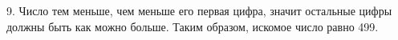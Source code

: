 9. Число тем меньше, чем меньше его первая цифра, значит остальные цифры должны быть как можно больше. Таким образом, искомое число равно 499.\\

